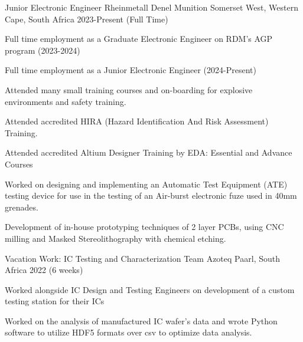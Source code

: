 \begin{cventries}
	

\cventry
{Junior Electronic Engineer} %
{Rheinmetall Denel Munition} %
{Somerset West, Western Cape, South Africa} %
{2023-Present (Full Time)} %
{
	\begin{cvitems} %
		\item {Full time employment as a Graduate Electronic Engineer on RDM's AGP program (2023-2024)}
		\item {Full time employment as a Junior Electronic Engineer (2024-Present)}
		\item {Attended many small training courses and on-boarding for explosive environments and safety training.}
		\item {Attended accredited HIRA (Hazard Identification And Risk Assessment) Training.}
		\item {Attended accredited Altium Designer Training by EDA: Essential and Advance Courses}
		\item {Worked on designing and implementing an Automatic Test Equipment (ATE) testing device for use in the testing of an Air-burst electronic fuze used in 40mm grenades.}
		\item {Development of in-house prototyping techniques of 2 layer PCBs, using CNC milling and Masked Stereolithography with chemical etching.}
	\end{cvitems}
}



  \cventry
{Vacation Work: IC Testing and Characterization Team} %
{Azoteq} %
{Paarl, South Africa} %
{2022 (6 weeks)} %
{
	\begin{cvitems} %
		\item {Worked alongside IC Design and Testing Engineers on development of a custom testing station for their ICs}
		\item {Worked on the analysis of manufactured IC wafer's data and wrote Python software to utilize HDF5 formats over csv to optimize data analysis.}
	\end{cvitems}
}


\end{cventries}
